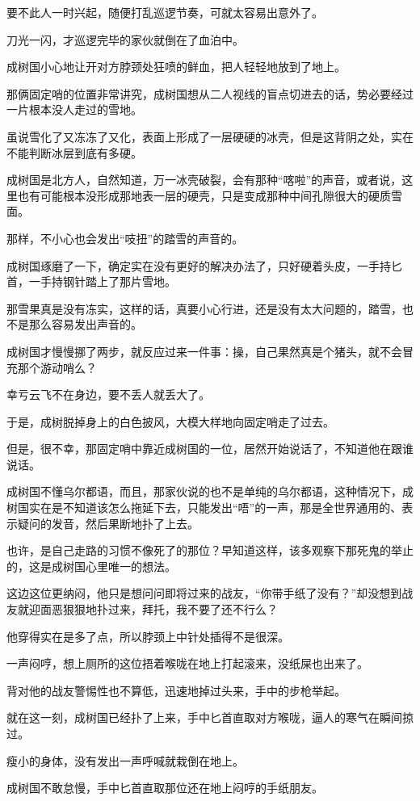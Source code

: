 要不此人一时兴起，随便打乱巡逻节奏，可就太容易出意外了。

刀光一闪，才巡逻完毕的家伙就倒在了血泊中。

成树国小心地让开对方脖颈处狂喷的鲜血，把人轻轻地放到了地上。

那俩固定哨的位置非常讲究，成树国想从二人视线的盲点切进去的话，势必要经过一片根本没人走过的雪地。

虽说雪化了又冻冻了又化，表面上形成了一层硬硬的冰壳，但是这背阴之处，实在不能判断冰层到底有多硬。

成树国是北方人，自然知道，万一冰壳破裂，会有那种“喀啦”的声音，或者说，这里也有可能根本没形成那地表一层的硬壳，只是变成那种中间孔隙很大的硬质雪面。

那样，不小心也会发出“吱扭”的踏雪的声音的。

成树国琢磨了一下，确定实在没有更好的解决办法了，只好硬着头皮，一手持匕首，一手持钢针踏上了那片雪地。

那雪果真是没有冻实，这样的话，真要小心行进，还是没有太大问题的，踏雪，也不是那么容易发出声音的。

成树国才慢慢挪了两步，就反应过来一件事：操，自己果然真是个猪头，就不会冒充那个游动哨么？

幸亏云飞不在身边，要不丢人就丢大了。

于是，成树脱掉身上的白色披风，大模大样地向固定哨走了过去。

但是，很不幸，那固定哨中靠近成树国的一位，居然开始说话了，不知道他在跟谁说话。

成树国不懂乌尔都语，而且，那家伙说的也不是单纯的乌尔都语，这种情况下，成树国实在是不知道该怎么拖延下去，只能发出“唔”的一声，那是全世界通用的、表示疑问的发音，然后果断地扑了上去。

也许，是自己走路的习惯不像死了的那位？早知道这样，该多观察下那死鬼的举止的，这是成树国心里唯一的想法。

这边这位更纳闷，他只是想问问即将过来的战友，“你带手纸了没有？”却没想到战友就迎面恶狠狠地扑过来，拜托，我不要了还不行么？

他穿得实在是多了点，所以脖颈上中针处插得不是很深。

一声闷哼，想上厕所的这位捂着喉咙在地上打起滚来，没纸屎也出来了。

背对他的战友警惕性也不算低，迅速地掉过头来，手中的步枪举起。

就在这一刻，成树国已经扑了上来，手中匕首直取对方喉咙，逼人的寒气在瞬间掠过。

瘦小的身体，没有发出一声呼喊就栽倒在地上。

成树国不敢怠慢，手中匕首直取那位还在地上闷哼的手纸朋友。

